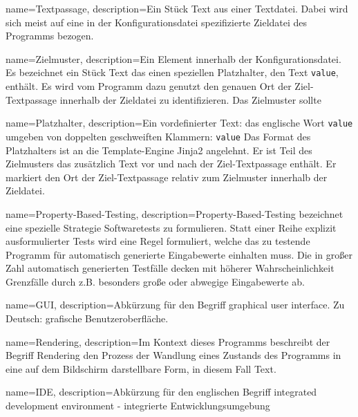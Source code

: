 \makeglossaries

{
    name=Textpassage,
    description={Ein Stück Text aus einer Textdatei. Dabei
            wird sich meist auf eine in der Konfigurationsdatei spezifizierte
            Zieldatei des Programms bezogen.}
}

{
    name=Zielmuster,
    description={Ein Element innerhalb der Konfigurationsdatei. Es bezeichnet ein
            Stück Text das einen speziellen \gls{Platzhalter}, den Text \texttt{{{value}}},
            enthält. Es wird vom Programm dazu genutzt den genauen Ort der Ziel-\gls{Textpassage}
            innerhalb der Zieldatei zu identifizieren. Das Zielmuster sollte}
}

{
    name=Platzhalter,
    description={Ein vordefinierter Text: das englische Wort \texttt{value}
            umgeben von doppelten geschweiften Klammern:
            \texttt{{{value}}} Das Format des Platzhalters ist an
            die Template-Engine Jinja2 \cite{jinja2} angelehnt.
            Er ist Teil des \gls{Zielmuster}s das zusätzlich Text vor und nach
            der Ziel-\gls{Textpassage} enthält. Er markiert den Ort der Ziel-\gls{Textpassage}
            relativ zum \gls{Zielmuster} innerhalb der Zieldatei.}
}

{
    name=Property-Based-Testing,
    description={Property-Based-Testing bezeichnet eine spezielle Strategie Softwaretests
            zu formulieren. Statt einer Reihe explizit ausformulierter Tests wird eine Regel
            formuliert, welche das zu testende Programm für automatisch generierte Eingabewerte
            einhalten muss. Die in großer Zahl automatisch generierten Testfälle
            decken mit höherer Wahrscheinlichkeit Grenzfälle durch z.B. besonders
            große oder abwegige Eingabewerte ab.}
}

{
    name=GUI,
    description={Abkürzung für den Begriff graphical user interface. Zu Deutsch:
            grafische Benutzeroberfläche.}
}

{
    name=Rendering,
    description={Im Kontext dieses Programms beschreibt der Begriff Rendering den
            Prozess der Wandlung eines Zustands des Programms in eine auf dem Bildschirm
            darstellbare Form, in diesem Fall Text.}
}

{
    name=IDE,
    description={Abkürzung für den englischen Begriff integrated development
            environment - integrierte Entwicklungsumgebung}
}


